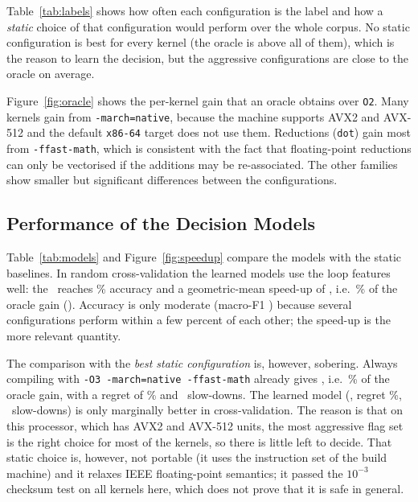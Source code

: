 \documentclass[12pt,a4paper]{article}
\begin{document}
Table~\ref{tab:labels} shows how often each configuration is the label and how a
\emph{static} choice of that configuration would perform over the whole corpus.
No static configuration is best for every kernel (the oracle is above all of them), which is the reason to learn the decision, but the aggressive configurations are close to the oracle on average.





Figure~\ref{fig:oracle} shows the per-kernel gain that an oracle obtains over \texttt{O2}.
Many kernels gain from \texttt{-march=native}, because the machine supports AVX2 and
AVX-512 and the default \texttt{x86-64} target does not use them. Reductions
(\texttt{dot}) gain most from \texttt{-ffast-math}, which is consistent with the fact that
floating-point reductions can only be vectorised if the additions may be re-associated.
The other families show smaller but significant differences between the configurations.

\subsection{Performance of the Decision Models}



Table~\ref{tab:models} and Figure~\ref{fig:speedup} compare the models with the static baselines. In random
cross-validation the learned models use the loop features well: the \selModel\ reaches \selAccCV\% accuracy and a
geometric-mean speed-up of \selGMCV, i.e.\ \selFracCV\% of the oracle gain (\oracleGM). Accuracy is only moderate
(macro-F1 \selFscoreCV) because several configurations perform within a few percent of each other; the speed-up is the
more relevant quantity.

The comparison with the \emph{best static configuration} is, however, sobering. Always compiling with
\texttt{-O3 -march=native -ffast-math} already gives \gmOFast, i.e.\ \fastFrac\% of the oracle gain, with a regret of
\fastRegret\% and \fastSlow\ slow-downs. The learned model (\selGMCV, regret \selRegretCV\%, \selSlowCV\ slow-downs) is
only marginally better in cross-validation. The reason is that on this processor, which has AVX2 and AVX-512 units,
the most aggressive flag set is the right choice for most of the kernels, so there is little left to decide. That static
choice is, however, not portable (it uses the instruction set of the build machine) and it relaxes IEEE floating-point
semantics; it passed the $10^{-3}$ checksum test on all kernels here, which does not prove that it is safe in general.
\end{document}
